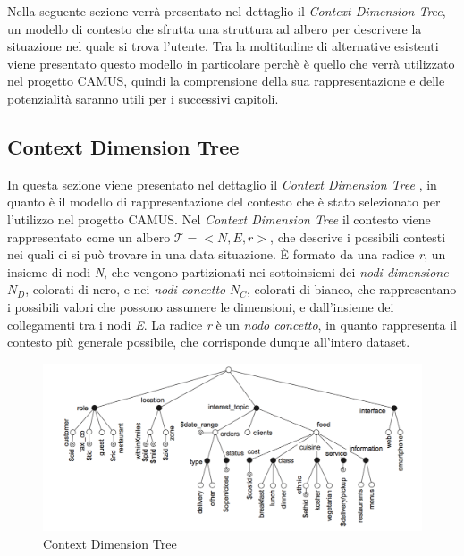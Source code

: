 Nella seguente sezione verrà presentato nel dettaglio il \emph{Context Dimension Tree}, un modello di contesto che sfrutta una struttura ad albero per descrivere la situazione nel quale si trova l'utente. Tra la moltitudine di alternative esistenti viene presentato questo modello in particolare perchè è quello che verrà utilizzato nel progetto CAMUS, quindi la comprensione della sua rappresentazione e delle potenzialità saranno utili per i successivi capitoli.

\subsection{Context Dimension Tree\label{sec:context-dimension-model}}

In questa sezione viene presentato nel dettaglio il \emph{Context Dimension Tree} \cite{DBLP:journals/is/BolchiniQT13}, in quanto è il modello di rappresentazione del contesto che è stato selezionato per l'utilizzo nel progetto CAMUS. Nel \emph{Context Dimension Tree} il contesto viene rappresentato come un albero $\mathcal{T} = {<}N, E, r{>} $, che descrive i possibili contesti nei quali ci si può trovare in una data situazione. \`E formato da una radice \emph{r}, un insieme di nodi \emph{N}, che vengono partizionati nei sottoinsiemi dei \emph{nodi dimensione} $N_D$, colorati di nero, e nei \emph{nodi concetto} $N_C$, colorati di bianco, che rappresentano i possibili valori che possono assumere le dimensioni, e dall'insieme dei collegamenti tra i nodi \emph{E}. La radice \emph{r} è un \emph{nodo concetto}, in quanto rappresenta il contesto più generale possibile, che corrisponde dunque all'intero dataset.

\begin{figure}[ht]
	\centering
	\includegraphics[width=\textwidth]{2-nozioni-preliminari/Immagini/esempio_cdt.png}
	\caption{Context Dimension Tree}\label{fig:context-dimension-tree}
\end{figure}

